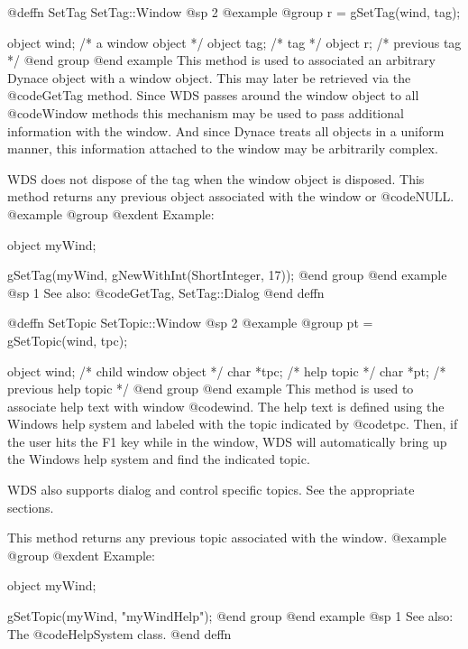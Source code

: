 @deffn {SetTag} SetTag::Window
@sp 2
@example
@group
r = gSetTag(wind, tag);

object  wind;   /*  a window object   */
object  tag;    /*  tag               */
object  r;      /*  previous tag      */
@end group
@end example
This method is used to associated an arbitrary Dynace object with a
window object.  This may later be retrieved via the @code{GetTag} method.
Since WDS passes around the window object to all @code{Window} methods
this mechanism may be used to pass additional information with the
window.  And since Dynace treats all objects in a uniform manner, this
information attached to the window may be arbitrarily complex.

WDS does not dispose of the tag when the window object is disposed.
This method returns any previous object associated with the window or
@code{NULL}.
@example
@group
@exdent Example:

object  myWind;

gSetTag(myWind, gNewWithInt(ShortInteger, 17));
@end group
@end example
@sp 1
See also:  @code{GetTag, SetTag::Dialog}
@end deffn












@deffn {SetTopic} SetTopic::Window
@sp 2
@example
@group
pt = gSetTopic(wind, tpc);

object  wind;   /*  child window object   */
char    *tpc;   /*  help topic            */
char    *pt;    /*  previous help topic   */
@end group
@end example
This method is used to associate help text with window @code{wind}.
The help text is defined using the Windows help system and labeled
with the topic indicated by @code{tpc}.  Then, if the user hits
the F1 key while in the window, WDS will automatically bring up
the Windows help system and find the indicated topic.

WDS also supports dialog and control specific topics.  See the appropriate
sections.

This method returns any previous topic associated with the window.
@example
@group
@exdent Example:

object  myWind;

gSetTopic(myWind, "myWindHelp");
@end group
@end example
@sp 1
See also:  The @code{HelpSystem} class.
@end deffn













